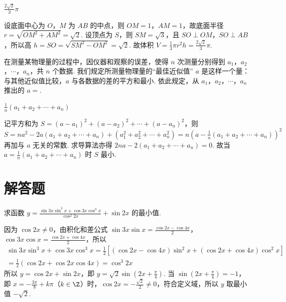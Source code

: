 \documentclass[UTF8,a4paper,oneside,11pt]{ctexbook}
\begin{document}
\begin{answer}
\(\frac{2\sqrt{2}}{3}\pi\)
\end{answer}

\begin{solution}
设底面中心为 \(O\)，\(M\) 为 \(AB\) 的中点，则 \(OM=1\)，\(AM=1\)，故底面半径 \(r=\sqrt{OM^{2}+AM^{2}}=\sqrt{2}\). 设顶点为 \(S\)，则 \(SM=\sqrt{3}\)，且 \(SO\perp OM\)，\(SO\perp AB\)，所以高 \(h=SO=\sqrt{SM^{2}-OM^{2}}=\sqrt{2}\). 故体积 \(V=\frac{1}{3}\pi r^{2}h=\frac{2\sqrt{2}}{3}\pi\).
\end{solution}

\begin{problem}
在测量某物理量的过程中，因仪器和观察的误差，使得 \(n\) 次测量分别得到 \(a_{1}\)，\(a_{2}\)，\(\cdots\)，\(a_{n}\)，共 \(n\) 个数据. 我们规定所测量物理量的“最佳近似值” \(a\) 是这样一个量：与其他近似值比较，\(a\) 与各数据的差的平方和最小. 依此规定，从 \(a_{1}\)，\(a_{2}\)，\(\cdots\)，\(a_{n}\) 推出的 \(a=\)\fillinblank{}.
\end{problem}

\begin{answer}
\(\frac{1}{n}\left( a_{1}+a_{2}+\cdots+a_{n} \right)\)
\end{answer}

\begin{solution}
记平方和为 \(S=\left( a-a_{1} \right)^{2}+\left( a-a_{2} \right)^{2}+\cdots+\left( a-a_{n} \right)^{2}\)，则 \(S=na^{2}-2a\left( a_{1}+a_{2}+\cdots+a_{n} \right)+\left( a_{1}^{2}+a_{2}^{2}+\cdots+a_{n}^{2} \right)=n\left( a-\frac{1}{n}\left( a_{1}+a_{2}+\cdots+a_{n} \right) \right)^{2}\) 再加与 \(a\) 无关的常数. 求导算法亦得 \(2na-2\left( a_{1}+a_{2}+\cdots+a_{n} \right)=0\). 故当 \(a=\frac{1}{n}\left( a_{1}+a_{2}+\cdots+a_{n} \right)\) 时 \(S\) 最小.
\end{solution}

\section{解答题}

\begin{problem}
求函数 \(y=\frac{\sin3x\sin^{3}x+\cos3x\cos^{3}x}{\cos^{2}2x}+\sin2x\) 的最小值.
\end{problem}

\begin{solution}
因为 \(\cos2x\neq 0\)，由积化和差公式 \(\sin3x\sin x=\frac{\cos2x-\cos4x}{2}\)，\(\cos3x\cos x=\frac{\cos2x+\cos4x}{2}\)，所以
\[ \begin{gathered}
\sin3x\sin^{3}x+\cos3x\cos^{3}x=\frac{1}{2}\left[\left(\cos2x-\cos4x\right)\sin^{2}x+\left(\cos2x+\cos4x\right)\cos^{2}x\right] \\
=\frac{1}{2}\left(\cos2x+\cos2x\cos4x\right)=\cos^{3}2x
\end{gathered} \]
所以 \(y=\cos2x+\sin2x\)，即 \(y=\sqrt{2}\sin\left(2x+\frac{\pi}{4}\right)\). 当 \(\sin\left(2x+\frac{\pi}{4}\right)=-1\)，即 \(x=-\frac{3\pi}{8}+k\pi\)（\(k\in\Z\)）时，\(\cos2x=-\frac{\sqrt{2}}{2}\neq 0\)，符合定义域，所以 \(y\) 取最小值 \(-\sqrt{2}\).
\end{solution}
\end{document}
